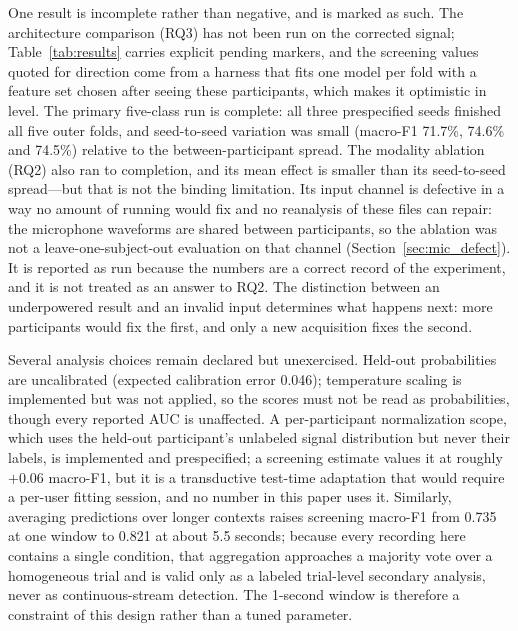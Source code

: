 \documentclass[pdflatex,sn-nature,iicol]{sn-jnl}
\begin{document}
One result is incomplete rather than negative, and is marked as such. The architecture comparison (RQ3) has not been run on the corrected signal; Table~\ref{tab:results} carries explicit pending markers, and the screening values quoted for direction come from a harness that fits one model per fold with a feature set chosen after seeing these participants, which makes it optimistic in level. The primary five-class run is complete: all three prespecified seeds finished all five outer folds, and seed-to-seed variation was small (macro-F1 71.7\%, 74.6\% and 74.5\%) relative to the between-participant spread. The modality ablation (RQ2) also ran to completion, and its mean effect is smaller than its seed-to-seed spread---but that is not the binding limitation. Its input channel is defective in a way no amount of running would fix and no reanalysis of these files can repair: the microphone waveforms are shared between participants, so the ablation was not a leave-one-subject-out evaluation on that channel (Section~\ref{sec:mic_defect}). It is reported as run because the numbers are a correct record of the experiment, and it is not treated as an answer to RQ2. The distinction between an underpowered result and an invalid input determines what happens next: more participants would fix the first, and only a new acquisition fixes the second.

Several analysis choices remain declared but unexercised. Held-out probabilities are uncalibrated (expected calibration error 0.046); temperature scaling is implemented but was not applied, so the scores must not be read as probabilities, though every reported AUC is unaffected. A per-participant normalization scope, which uses the held-out participant's unlabeled signal distribution but never their labels, is implemented and prespecified; a screening estimate values it at roughly $+0.06$ macro-F1, but it is a transductive test-time adaptation that would require a per-user fitting session, and no number in this paper uses it. Similarly, averaging predictions over longer contexts raises screening macro-F1 from 0.735 at one window to 0.821 at about 5.5 seconds; because every recording here contains a single condition, that aggregation approaches a majority vote over a homogeneous trial and is valid only as a labeled trial-level secondary analysis, never as continuous-stream detection. The 1-second window is therefore a constraint of this design rather than a tuned parameter.
\end{document}
